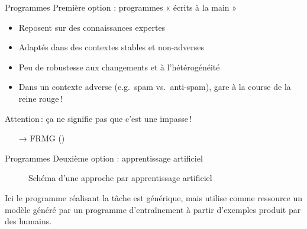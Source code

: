 \documentclass[hyperref={unicode}, xcolor={svgnames}, french]{beamer}
\begin{document}
\begin{frame}{Programmes}
    Première option : programmes « écrits à la main »
    \begin{itemize}
        \item Reposent sur des connaissances expertes
        \item Adaptés dans des contextes stables et non-adverses
        \item Peu de robustesse aux changements et à l'hétérogénéité
        \item Dans un contexte adverse (e.g.\ spam vs.\ anti-spam), gare à la course de la reine rouge !
    \end{itemize}
    Attention : ça ne signifie pas que c'est une impasse !
    \begin{itemize}
        \item[→] FRMG ()
    \end{itemize}
\end{frame}

\begin{frame}[fragile=singleslide]{Programmes}
    Deuxième option : apprentissage artificiel
    \begin{figure}
        \tikzset{external/export=true}
        \caption{Schéma d'une approche par apprentissage artificiel}
    \end{figure}
    Ici le \textcolor{highlighta}{programme réalisant la tâche} est générique, mais utilise comme ressource un \textcolor{highlight3}{modèle} généré par un \textcolor{highlight6}{programme d'entraînement} à partir d'\textcolor{highlight7}{exemples} produit par des humains.
\end{frame}
\end{document}
